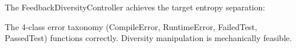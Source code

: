 
The FeedbackDiversityController achieves the target entropy separation:

\begin{table}[htbp]
\centering
{}
\end{table}

The 4-class error taxonomy (CompileError, RuntimeError, FailedTest, PassedTest) functions correctly. Diversity manipulation is mechanically feasible.
